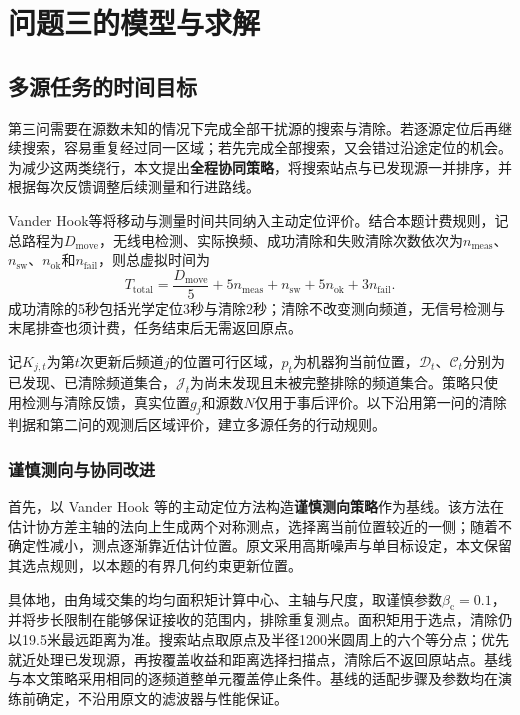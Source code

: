 \section{问题三的模型与求解}
\label{sec:q3}

\subsection{多源任务的时间目标}

第三问需要在源数未知的情况下完成全部干扰源的搜索与清除。若逐源定位后再继续搜索，容易重复经过同一区域；若先完成全部搜索，又会错过沿途定位的机会。为减少这两类绕行，本文提出\textbf{全程协同策略}，将搜索站点与已发现源一并排序，并根据每次反馈调整后续测量和行进路线。

Vander Hook等将移动与测量时间共同纳入主动定位评价\cite{VanderHook2014}。结合本题计费规则，记总路程为$D_{\mathrm{move}}$，无线电检测、实际换频、成功清除和失败清除次数依次为$n_{\mathrm{meas}}$、$n_{\mathrm{sw}}$、$n_{\mathrm{ok}}$和$n_{\mathrm{fail}}$，则总虚拟时间为
\begin{equation}
T_{\mathrm{total}}=\frac{D_{\mathrm{move}}}{5}+5n_{\mathrm{meas}}+n_{\mathrm{sw}}
                     +5n_{\mathrm{ok}}+3n_{\mathrm{fail}}.
\label{eq:q3-cost}
\end{equation}
成功清除的5秒包括光学定位3秒与清除2秒；清除不改变测向频道，无信号检测与末尾排查也须计费，任务结束后无需返回原点。

记$K_{j,t}$为第$t$次更新后频道$j$的位置可行区域，$p_t$为机器狗当前位置，$\mathcal D_t$、$\mathcal C_t$分别为已发现、已清除频道集合，$\mathcal J_t$为尚未发现且未被完整排除的频道集合。策略只使用检测与清除反馈，真实位置$g_j$和源数$N$仅用于事后评价。以下沿用第一问的清除判据和第二问的观测后区域评价，建立多源任务的行动规则。


\subsubsection{谨慎测向与协同改进}

首先，以 Vander Hook 等的主动定位方法\cite{VanderHook2014}构造\textbf{谨慎测向策略}作为基线。该方法在估计协方差主轴的法向上生成两个对称测点，选择离当前位置较近的一侧；随着不确定性减小，测点逐渐靠近估计位置。原文采用高斯噪声与单目标设定，本文保留其选点规则，以本题的有界几何约束更新位置。

具体地，由角域交集的均匀面积矩计算中心、主轴与尺度，取谨慎参数$\beta_{\mathrm c}=0.1$，并将步长限制在能够保证接收的范围内，排除重复测点。面积矩用于选点，清除仍以19.5米最远距离为准。搜索站点取原点及半径1200米圆周上的六个等分点；优先就近处理已发现源，再按覆盖收益和距离选择扫描点，清除后不返回原站点。基线与本文策略采用相同的逐频道整单元覆盖停止条件。基线的适配步骤及参数均在演练前确定，不沿用原文的滤波器与性能保证。

